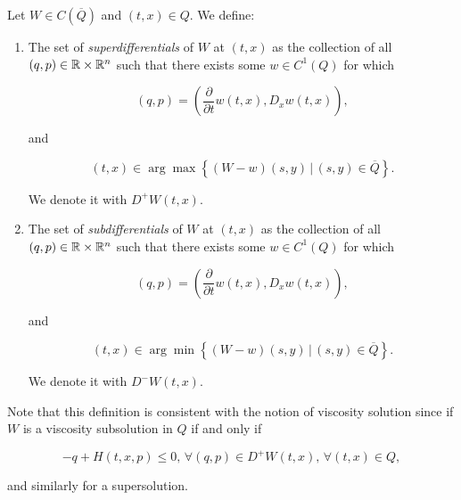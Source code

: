 \begin{definition}
    Let $W\in C(\overline{Q})$ and $(t,x)\in Q$. We define:

    \begin{enumerate}
        \item The set of \textit{superdifferentials} of $W$ at $(t,x)$ as the collection of all $(q,p)\in\mathbb{R}\times\mathbb{R}^n$ such that 
        there exists some $w\in C^1(Q)$ for which
        
        \begin{equation}
            (q,p) = \left(\frac{\partial}{\partial t}w(t,x),D_x w(t,x)\right),
        \end{equation}

        and

        \begin{equation}
            (t,x) \in \arg \max \left\{(W-w)(s,y)\,|\,(s,y)\in\overline{Q}\right\}.
        \end{equation}

        We denote it with $D^+W(t,x)$.

        \item The set of \textit{subdifferentials} of $W$ at $(t,x)$ as the collection of all $(q,p)\in\mathbb{R}\times\mathbb{R}^n$ such that 
        there exists some $w\in C^1(Q)$ for which
        
        \begin{equation}
            (q,p) = \left(\frac{\partial}{\partial t}w(t,x),D_x w(t,x)\right),
        \end{equation}

        and

        \begin{equation}
            (t,x) \in \arg \min \left\{(W-w)(s,y)\,|\,(s,y)\in\overline{Q}\right\}.
        \end{equation}

        We denote it with $D^-W(t,x)$.
    \end{enumerate}
\end{definition}

Note that this definition is consistent with the notion of viscosity solution since if $W$ is a viscosity subsolution in $Q$ 
if and only if 

\[-q+H(t,x,p)\leq 0,\,\forall (q,p)\in D^+W(t,x),\,\forall(t,x)\in Q,\]

and similarly for a supersolution. 

